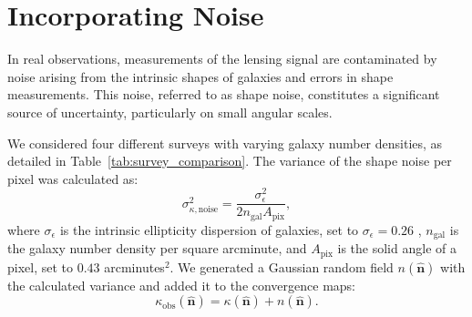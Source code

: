 \section{Incorporating Noise}
In real observations, measurements of the lensing signal are contaminated by noise arising from the intrinsic shapes of galaxies and errors in shape measurements. This noise, referred to as shape noise, constitutes a significant source of uncertainty, particularly on small angular scales.

We considered four different surveys with varying galaxy number densities, as detailed in Table~\ref{tab:survey_comparison}.
The variance of the shape noise per pixel was calculated as:
\begin{equation}
    \sigma_{\kappa, \text{noise}}^2 = \frac{\sigma_{\epsilon}^2}{2 n_{\mathrm{gal}} A_{\mathrm{pix}}},
\end{equation}
where $\sigma_{\epsilon}$ is the intrinsic ellipticity dispersion of galaxies, set to $\sigma_{\epsilon} = 0.26$ \citep{2019A&A...627A..59E}, $n_{\mathrm{gal}}$ is the galaxy number density per square arcminute, and $A_{\mathrm{pix}}$ is the solid angle of a pixel, set to $0.43$ arcminutes$^2$.
We generated a Gaussian random field $n(\hat{\mathbf{n}})$ with the calculated variance and added it to the convergence maps:
\begin{equation}
    \kappa_{\mathrm{obs}}(\hat{\mathbf{n}}) = \kappa(\hat{\mathbf{n}}) + n(\hat{\mathbf{n}}).
\end{equation}


